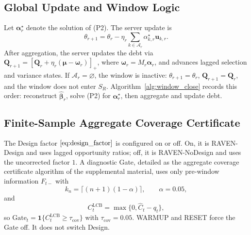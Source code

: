 \documentclass[letterpaper,journal]{IEEEtran}
\begin{document}
\subsection{Global Update and Window Logic}
\label{subsec:global_update}

Let $\boldsymbol\alpha_r^\star$ denote the solution of (P2).  The server update
is
\begin{equation}
 \theta_{r+1}
 =
 \theta_r
 -
 \eta_r
 \sum_{k\in\mathcal{A}_r}
 \alpha^\star_{k,r}\mathbf{u}_{k,r}.
 \label{eq:server_update}
\end{equation}
After aggregation, the server updates the debt via
$\mathbf{Q}_{r+1}=\left[\mathbf{Q}_r+\eta_r(\boldsymbol\mu-\boldsymbol\omega_r)\right]_+$,
where $\boldsymbol\omega_r=M_r\boldsymbol\alpha_r$, and advances lagged
selection and variance states.  If $\mathcal{A}_r=\varnothing$, the
window is inactive: $\theta_{r+1}=\theta_r$, $\mathbf{Q}_{r+1}=\mathbf{Q}_r$,
and the window does not enter $S_R$.  Algorithm~\ref{alg:window_close}
records this order: reconstruct $\widehat{\boldsymbol\beta}_r$, solve (P2) for
$\boldsymbol\alpha_r^\star$, then aggregate and update debt.

\subsection{Finite-Sample Aggregate Coverage Certificate}
\label{subsec:agg_certificate_alg}

The Design factor $\eqref{eq:design_factor}$ is configured on or off.  On, it
is RAVEN-Design and uses lagged opportunity ratios; off, it is RAVEN-NoDesign
and uses the uncorrected factor $1$.  A diagnostic Gate, detailed as the
aggregate coverage certificate algorithm of the supplemental material, uses only
pre-window information $F_{t-}$ with
\begin{equation}
 k_n=\lceil(n+1)(1-\alpha)\rceil,
 \qquad
 \alpha=0.05,
 \label{eq:agg_kn}
\end{equation}
and
\begin{equation}
 C^{\mathrm{LCB}}_t=\max\{0,\widehat C_t-q_t\},
 \label{eq:agg_CLCB}
\end{equation}
so $\mathrm{Gate}_t=\mathbf{1}\{C^{\mathrm{LCB}}_t\ge\tau_{\mathrm{cov}}\}$ with
$\tau_{\mathrm{cov}}=0.05$.  WARMUP and RESET force the Gate off.  It does
not switch Design.
\end{document}

